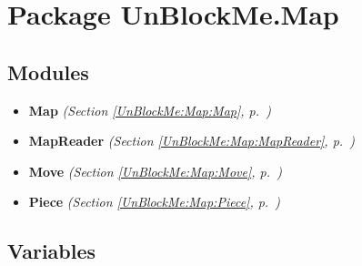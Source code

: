 %
%
%


\section{Package UnBlockMe.Map}

    \label{UnBlockMe:Map}


\subsection{Modules}

\begin{itemize}
\setlength{\parskip}{0ex}
\item \textbf{Map}
  \textit{(Section \ref{UnBlockMe:Map:Map}, p.~\pageref{UnBlockMe:Map:Map})}

\item \textbf{MapReader}
  \textit{(Section \ref{UnBlockMe:Map:MapReader}, p.~\pageref{UnBlockMe:Map:MapReader})}

\item \textbf{Move}
  \textit{(Section \ref{UnBlockMe:Map:Move}, p.~\pageref{UnBlockMe:Map:Move})}

\item \textbf{Piece}
  \textit{(Section \ref{UnBlockMe:Map:Piece}, p.~\pageref{UnBlockMe:Map:Piece})}

\end{itemize}



  \subsection{Variables}

